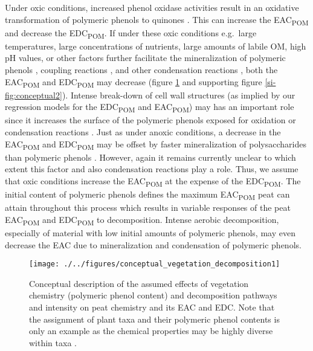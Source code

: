 \documentclass[draft,linenumbers]{agujournal2018}
\begin{document}
Under oxic conditions, increased phenol oxidase activities result in an
oxidative transformation of polymeric phenols to quinones
\citep{Fenner.2011, Schellekens.2015, Bolton.2018}. This can increase
the EAC\textsubscript{POM} and decrease the EDC\textsubscript{POM}. If
under these oxic conditions e.g.~large temperatures, large
concentrations of nutrients, large amounts of labile OM, high pH values,
or other factors further facilitate the mineralization of polymeric
phenols \citep{Bragazza.2007, Fenner.2011, Kang.2018c, Bowring.2020},
coupling reactions
\citep{Hotta.2002, Johnson.2015, Bolton.2018, Zhao.2020}, and other
condensation reactions
\citep{Bolton.2018, Olk.2006, Heitmann.2006, Yu.2016}, both the
EAC\textsubscript{POM} and EDC\textsubscript{POM} may decrease (figure
\ref{fig:conceptual1} and supporting figure \ref{si-fig:conceptual2}).
Intense break-down of cell wall structures (as implied by our regression
models for the EDC\textsubscript{POM} and EAC\textsubscript{POM}) may
has an important role since it increases the surface of the polymeric
phenols exposed for oxidation or condensation reactions
\citep{Tsuneda.2001}. Just as under anoxic conditions, a decrease in the
EAC\textsubscript{POM} and EDC\textsubscript{POM} may be offset by
faster mineralization of polysaccharides than polymeric phenols
\citep{Benner.1984}. However, again it remains currently unclear to
which extent this factor and also condensation reactions play a role.
Thus, we assume that oxic conditions increase the EAC\textsubscript{POM}
at the expense of the EDC\textsubscript{POM}. The initial content of
polymeric phenols defines the maximum EAC\textsubscript{POM} peat can
attain throughout this process which results in variable responses of
the peat EAC\textsubscript{POM} and EDC\textsubscript{POM} to
decomposition. Intense aerobic decomposition, especially of material
with low initial amounts of polymeric phenols, may even decrease the EAC
due to mineralization and condensation of polymeric phenols.

\begin{figure}[H]

{\centering \texttt{[image: ./../figures/conceptual\_vegetation\_decomposition1]} 

}

\caption{Conceptual description of the assumed effects of vegetation chemistry (polymeric phenol content) and decomposition pathways and intensity on peat chemistry and its EAC and EDC. Note that the assignment of plant taxa and their polymeric phenol contents is only an example as the chemical properties may be highly diverse within taxa \citet{Bengtsson.2018}.}\label{fig:conceptual1}
\end{figure}
\end{document}
